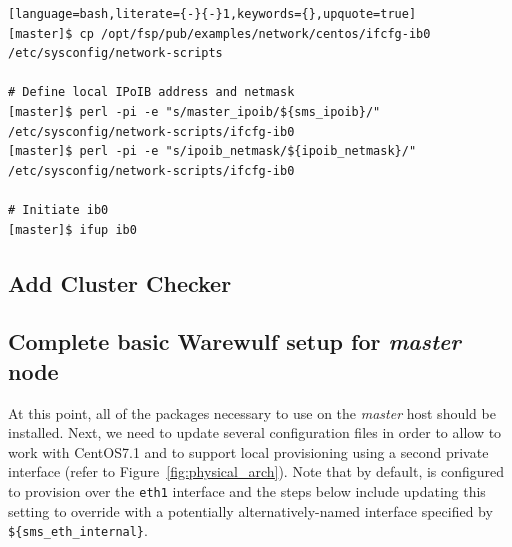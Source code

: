 \documentclass[letterpaper]{article}
\newcommand{\baseOS}{CentOS7.1}
\begin{document}
\begin{lstlisting}[language=bash,literate={-}{-}1,keywords={},upquote=true]
[master]$ cp /opt/fsp/pub/examples/network/centos/ifcfg-ib0 /etc/sysconfig/network-scripts

# Define local IPoIB address and netmask
[master]$ perl -pi -e "s/master_ipoib/${sms_ipoib}/" /etc/sysconfig/network-scripts/ifcfg-ib0
[master]$ perl -pi -e "s/ipoib_netmask/${ipoib_netmask}/" /etc/sysconfig/network-scripts/ifcfg-ib0

# Initiate ib0
[master]$ ifup ib0
\end{lstlisting}

\subsection{Add Cluster Checker} \label{sec:add_clck}


\subsection{Complete basic Warewulf setup for {\em master} node} \label{sec:setup_ww}

At this point, all of the packages necessary to use \Warewulf{} on the {\em
  master} host should be installed.  Next, we need to update several
configuration files in order to allow \Warewulf{} to work with \baseOS{} and to
support local provisioning using a second private interface (refer to
Figure~\ref{fig:physical_arch}). Note that by default, \Warewulf{} is configured to
provision over the \texttt{eth1} interface and the steps below include updating
this setting to override with a potentially alternatively-named interface specified by
\texttt{\$\{sms\_eth\_internal\}}.


\end{document}
